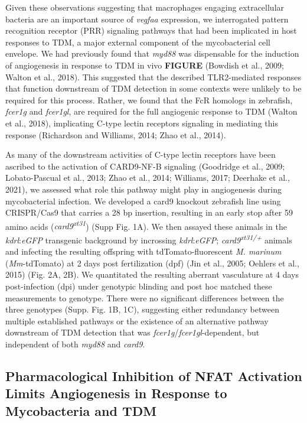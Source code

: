 Given these observations suggesting that macrophages engaging extracellular bacteria are an important source of \textit{vegfaa} expression, we interrogated pattern recognition receptor (PRR) signaling pathways that had been implicated in host responses to TDM, a major external component of the mycobacterial cell envelope. We had previously found that \textit{myd88} was dispensable for the induction of angiogenesis in response to TDM in vivo \textbf{FIGURE} (Bowdish et al., 2009; Walton et al., 2018). This suggested that the described TLR2-mediated responses that function downstream of TDM detection in some contexts were unlikely to be required for this process. Rather, we found that the Fc\textgamma R homologs in zebrafish, \textit{fcer1g} and \textit{fcer1gl}, are required for the full angiogenic response to TDM (Walton et al., 2018), implicating C-type lectin receptors signaling in mediating this response (Richardson and Williams, 2014; Zhao et al., 2014).

As many of the downstream activities of C-type lectin receptors have been ascribed to the activation of CARD9-NF-\textkappa B signaling (Goodridge et al., 2009; Lobato-Pascual et al., 2013; Zhao et al., 2014; Williams, 2017; Deerhake et al., 2021), we assessed what role this pathway might play in angiogenesis during mycobacterial infection. We developed a card9 knockout zebrafish line using CRISPR/Cas9 that carries a 28 bp insertion, resulting in an early stop after 59 amino acids (\textit{card9\textsuperscript{xt31}}) (Supp Fig. 1A). We then assayed these animals in the \textit{kdrl}:\textit{eGFP} transgenic background by incrossing \textit{kdrl}:\textit{eGFP}; \textit{card9\textsuperscript{xt31/+}} animals and infecting the resulting offspring with tdTomato-fluorescent \textit{M. marinum} (\textit{Mm}-tdTomato) at 2 days post fertilization (dpf) (Jin et al., 2005; Oehlers et al., 2015) (Fig. 2A, 2B). We quantitated the resulting aberrant vasculature at 4 days post-infection (dpi) under genotypic blinding and post hoc matched these measurements to genotype. There were no significant differences between the three genotypes (Supp. Fig. 1B, 1C), suggesting either redundancy between multiple established pathways or the existence of an alternative pathway downstream of TDM detection that was \textit{fcer1g}/\textit{fcer1gl}-dependent, but independent of both \textit{myd88} and \textit{card9}. 

\subsection{Pharmacological Inhibition of NFAT Activation Limits Angiogenesis in Response to Mycobacteria and TDM}


